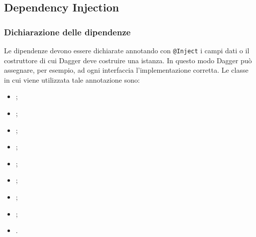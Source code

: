 \documentclass[../ManualeSviluppatore.tex]{subfiles}
\begin{document}
	\subsection{Dependency Injection}
		\subsubsection{Dichiarazione delle dipendenze}
	Le dipendenze devono essere dichiarate annotando con \lstinline|@Inject| i campi dati o il costruttore di cui Dagger deve costruire una istanza. In questo modo Dagger può assegnare, per esempio, ad ogni interfaccia l'implementazione corretta. Le classe in cui viene utilizzata tale annotazione sono:
	\begin{itemize}
		\item \HomeActivity;
		\item \DeveloperUnlockerActivity;
		\item \LogInformationActivity;
		\item \MainDeveloperActivity;
		\item \MainDeveloperPresenter;
		\item \MyApplication;
		\item \NavigationActivity;
		\item \NearbyPoiActivity;
		\item \PoiCategoryActivity.
	\end{itemize}
\end{document}
